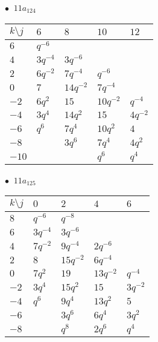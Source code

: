 \begin{minipage}{\linewidth}
$\bullet\ $ $11a_{124}$ \vspace{0.5em} \\
\begin{tabular}{l|llll}
$k \setminus j$ & $6$ & $8$ & $10$ & $12$ \\
\hline
$6$ & $q^{-6}$ &  &  &  \\
$4$ & $3q^{-4}$ & $3q^{-6}$ &  &  \\
$2$ & $6q^{-2}$ & $7q^{-4}$ & $q^{-6}$ &  \\
$0$ & $7$ & $14q^{-2}$ & $7q^{-4}$ &  \\
$-2$ & $6q^{2}$ & $15$ & $10q^{-2}$ & $q^{-4}$ \\
$-4$ & $3q^{4}$ & $14q^{2}$ & $15$ & $4q^{-2}$ \\
$-6$ & $q^{6}$ & $7q^{4}$ & $10q^{2}$ & $4$ \\
$-8$ &  & $3q^{6}$ & $7q^{4}$ & $4q^{2}$ \\
$-10$ &  &  & $q^{6}$ & $q^{4}$ \\
\end{tabular}
\vspace{2em}
\end{minipage}
%
\begin{minipage}{\linewidth}
$\bullet\ $ $11a_{125}$ \vspace{0.5em} \\
\begin{tabular}{l|llll}
$k \setminus j$ & $0$ & $2$ & $4$ & $6$ \\
\hline
$8$ & $q^{-6}$ & $q^{-8}$ &  &  \\
$6$ & $3q^{-4}$ & $3q^{-6}$ &  &  \\
$4$ & $7q^{-2}$ & $9q^{-4}$ & $2q^{-6}$ &  \\
$2$ & $8$ & $15q^{-2}$ & $6q^{-4}$ &  \\
$0$ & $7q^{2}$ & $19$ & $13q^{-2}$ & $q^{-4}$ \\
$-2$ & $3q^{4}$ & $15q^{2}$ & $15$ & $3q^{-2}$ \\
$-4$ & $q^{6}$ & $9q^{4}$ & $13q^{2}$ & $5$ \\
$-6$ &  & $3q^{6}$ & $6q^{4}$ & $3q^{2}$ \\
$-8$ &  & $q^{8}$ & $2q^{6}$ & $q^{4}$ \\
\end{tabular}
\vspace{2em}
\end{minipage}
%
